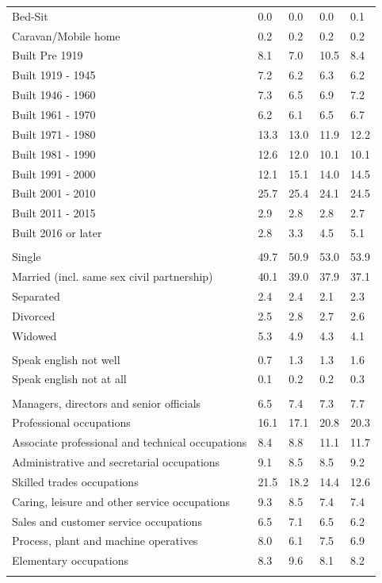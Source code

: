 \documentclass{article}
\begin{document}
\begin{table}[h]
\begin{tabular}{KTTTT}
Bed-Sit & 0.0& 0.0& 0.0& 0.1\\
Caravan/Mobile home & 0.2& 0.2& 0.2& 0.2\\
    \hline
Built Pre 1919 &  8.1&  7.0& 10.5&  8.4\\
Built 1919 - 1945 & 7.2& 6.2& 6.3& 6.2\\
Built  1946 - 1960 & 7.3& 6.5& 6.9& 7.2\\
Built  1961 - 1970 & 6.2& 6.1& 6.5& 6.7\\
Built  1971 - 1980 & 13.3& 13.0& 11.9& 12.2\\
Built  1981 - 1990 & 12.6& 12.0& 10.1& 10.1\\
Built  1991 - 2000 & 12.1& 15.1& 14.0& 14.5\\
Built  2001 - 2010 & 25.7& 25.4& 24.1& 24.5\\
Built  2011 - 2015 & 2.9& 2.8& 2.8& 2.7\\
Built  2016 or later & 2.8& 3.3& 4.5& 5.1\\
\hline
    \\
    \hline
Single & 49.7& 50.9& 53.0& 53.9\\
Married (incl. same sex civil partnership) & 40.1& 39.0& 37.9& 37.1\\
Separated  & 2.4& 2.4& 2.1& 2.3\\
Divorced  & 2.5& 2.8& 2.7& 2.6\\
Widowed & 5.3& 4.9& 4.3& 4.1\\
\hline
    \\ 
    \hline
Speak english not well & 0.7& 1.3& 1.3& 1.6\\
Speak english not at all & 0.1& 0.2& 0.2& 0.3\\
\hline
    \\
    \hline
Managers, directors and senior officials & 6.5& 7.4& 7.3& 7.7\\
Professional occupations & 16.1& 17.1& 20.8& 20.3\\
Associate professional and technical occupations &  8.4&  8.8& 11.1& 11.7\\
Administrative and secretarial occupations & 9.1& 8.5& 8.5& 9.2\\
Skilled trades occupations & 21.5& 18.2& 14.4& 12.6\\
Caring, leisure and other service occupations & 9.3& 8.5& 7.4& 7.4\\
Sales and customer service occupations & 6.5& 7.1& 6.5& 6.2\\
Process, plant and machine operatives & 8.0& 6.1& 7.5& 6.9\\
Elementary occupations & 8.3& 9.6& 8.1& 8.2\\
\hline
\end{tabular}
\end{table}
\end{document}
